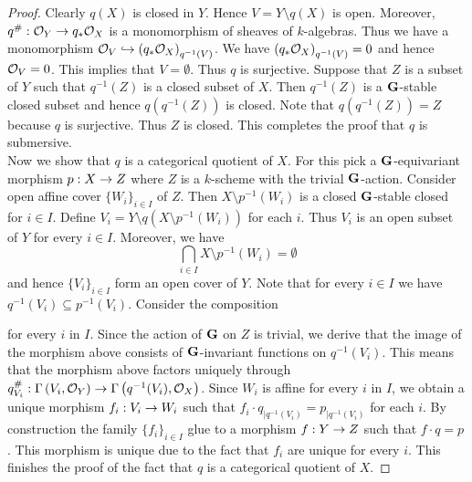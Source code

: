 \begin{proof}
Clearly $q(X)$ is closed in $Y$. Hence $V = Y\setminus q(X)$ is open. Moreover, $q^{\#}:{\mathcal O}_Y\rightarrow q_*{\mathcal O}_X$ is a monomorphism of sheaves of $k$-algebras. Thus we have a monomorphism ${\mathcal O}_V\hookrightarrow \left(q_*{\mathcal O}_X\right)_{q^{-1}(V)}$. We have $\left(q_*{\mathcal O}_X\right)_{q^{-1}(V)} =0$ and hence ${\mathcal O}_V =0$. This implies that $V = \emptyset$. Thus $q$ is surjective. Suppose that $Z$ is a subset of $Y$ such that $q^{-1}(Z)$ is a closed subset of $X$. Then $q^{-1}(Z)$ is a $\mathbf{G}$-stable closed subset and hence $q\left(q^{-1}(Z)\right)$ is closed. Note that $q\left(q^{-1}(Z)\right) = Z$ because $q$ is surjective. Thus $Z$ is closed. This completes the proof that $q$ is submersive.\\
Now we show that $q$ is a categorical quotient of $X$. For this pick a $\mathbf{G}$-equivariant morphism $p:X\rightarrow Z$ where $Z$ is a $k$-scheme with the trivial $\mathbf{G}$-action. Consider open affine cover $\{W_i\}_{i\in I}$ of $Z$. Then $X\setminus p^{-1}(W_i)$ is a closed $\mathbf{G}$-stable closed for $i\in I$. Define $V_i = Y \setminus q\left(X\setminus p^{-1}(W_i)\right)$ for each $i$. Thus $V_i$ is an open subset of $Y$ for every $i\in I$. Moreover, we have
$$\bigcap_{i\in I}X\setminus p^{-1}(W_i) = \emptyset$$
and hence $\{V_i\}_{i\in I}$ form an open cover of $Y$. Note that for every $i\in I$ we have $q^{-1}(V_i)\subseteq p^{-1}(V_i)$. Consider the composition
\begin{center}
\end{center}
for every $i$ in $I$. Since the action of $\mathbf{G}$ on $Z$ is trivial, we derive that the image of the morphism above consists of $\mathbf{G}$-invariant functions on $q^{-1}(V_i)$. This means that the morphism above factors uniquely through $q^{\#}_{V_i}:\Gamma\left(V_i,{\mathcal O}_Y\right)\rightarrow \Gamma\left(q^{-1}(V_i),{\mathcal O}_X\right)$. Since $W_i$ is affine for every $i$ in $I$, we obtain a unique morphism $f_i:V_i\rightarrow W_i$ such that $f_i\cdot q_{\mid q^{-1}(V_i)} = p_{\mid q^{-1}(V_i)}$ for each $i$. By construction the family $\{f_i\}_{i\in I}$ glue to a morphism $f:Y\rightarrow Z$ such that $f\cdot q = p$. This morphism is unique due to the fact that $f_i$ are unique for every $i$. This finishes the proof of the fact that $q$ is a categorical quotient of $X$.
\end{proof}

